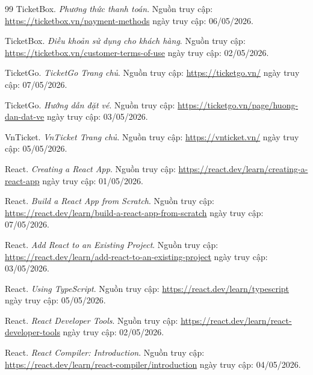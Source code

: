 \begin{thebibliography}{99}
TicketBox. \textit{Phương thức thanh toán}. 
Nguồn truy cập: \url{https://ticketbox.vn/payment-methods} ngày truy cập: 06/05/2026.

TicketBox. \textit{Điều khoản sử dụng cho khách hàng}. 
Nguồn truy cập: \url{https://ticketbox.vn/customer-terms-of-use} ngày truy cập: 02/05/2026.

TicketGo. \textit{TicketGo Trang chủ}. 
Nguồn truy cập: \url{https://ticketgo.vn/} ngày truy cập: 07/05/2026.

TicketGo. \textit{Hướng dẫn đặt vé}. 
Nguồn truy cập: \url{https://ticketgo.vn/page/huong-dan-dat-ve} ngày truy cập: 03/05/2026.

VnTicket. \textit{VnTicket Trang chủ}. 
Nguồn truy cập: \url{https://vnticket.vn/} ngày truy cập: 05/05/2026.

React. \textit{Creating a React App}. 
Nguồn truy cập: \url{https://react.dev/learn/creating-a-react-app} ngày truy cập: 01/05/2026.

React. \textit{Build a React App from Scratch}. 
Nguồn truy cập: \url{https://react.dev/learn/build-a-react-app-from-scratch} ngày truy cập: 07/05/2026.

React. \textit{Add React to an Existing Project}. 
Nguồn truy cập: \url{https://react.dev/learn/add-react-to-an-existing-project} ngày truy cập: 03/05/2026.

React. \textit{Using TypeScript}. 
Nguồn truy cập: \url{https://react.dev/learn/typescript} ngày truy cập: 05/05/2026.

React. \textit{React Developer Tools}. 
Nguồn truy cập: \url{https://react.dev/learn/react-developer-tools} ngày truy cập: 02/05/2026.

React. \textit{React Compiler: Introduction}. 
Nguồn truy cập: \url{https://react.dev/learn/react-compiler/introduction} ngày truy cập: 04/05/2026.




\end{thebibliography}
